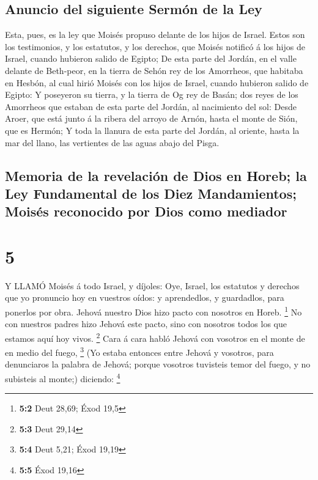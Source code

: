 \hypertarget{anuncio-del-siguiente-sermuxf3n-de-la-ley}{%
\subsection{Anuncio del siguiente Sermón de la
Ley}\label{anuncio-del-siguiente-sermuxf3n-de-la-ley}}

 Esta, pues, es la ley que Moisés propuso delante de los
hijos de Israel.  Estos son los testimonios, y los
estatutos, y los derechos, que Moisés notificó á los hijos de Israel,
cuando hubieron salido de Egipto;  De esta parte del
Jordán, en el valle delante de Beth-peor, en la tierra de Sehón rey de
los Amorrheos, que habitaba en Hesbón, al cual hirió Moisés con los
hijos de Israel, cuando hubieron salido de Egipto:  Y
poseyeron su tierra, y la tierra de Og rey de Basán; dos reyes de los
Amorrheos que estaban de esta parte del Jordán, al nacimiento del sol:
 Desde Aroer, que está junto á la ribera del arroyo de
Arnón, hasta el monte de Sión, que es Hermón;  Y toda la
llanura de esta parte del Jordán, al oriente, hasta la mar del llano,
las vertientes de las aguas abajo del Pisga.

\hypertarget{memoria-de-la-revelaciuxf3n-de-dios-en-horeb-la-ley-fundamental-de-los-diez-mandamientos-moisuxe9s-reconocido-por-dios-como-mediador}{%
\subsection{Memoria de la revelación de Dios en Horeb; la Ley
Fundamental de los Diez Mandamientos; Moisés reconocido por Dios como
mediador}\label{memoria-de-la-revelaciuxf3n-de-dios-en-horeb-la-ley-fundamental-de-los-diez-mandamientos-moisuxe9s-reconocido-por-dios-como-mediador}}

\hypertarget{section-4}{%
\section{5}\label{section-4}}

 Y LLAMÓ Moisés á todo Israel, y díjoles: Oye, Israel, los
estatutos y derechos que yo pronuncio hoy en vuestros oídos: y
aprendedlos, y guardadlos, para ponerlos por obra.  Jehová
nuestro Dios hizo pacto con nosotros en Horeb. \footnote{\textbf{5:2}
  Deut 28,69; Éxod 19,5}  No con nuestros padres hizo Jehová
este pacto, sino con nosotros todos los que estamos aquí hoy vivos.
\footnote{\textbf{5:3} Deut 29,14}  Cara á cara habló Jehová
con vosotros en el monte de en medio del fuego, \footnote{\textbf{5:4}
  Deut 5,21; Éxod 19,19}  (Yo estaba entonces entre Jehová y
vosotros, para denunciaros la palabra de Jehová; porque vosotros
tuvisteis temor del fuego, y no subisteis al monte;) diciendo:
\footnote{\textbf{5:5} Éxod 19,16}

